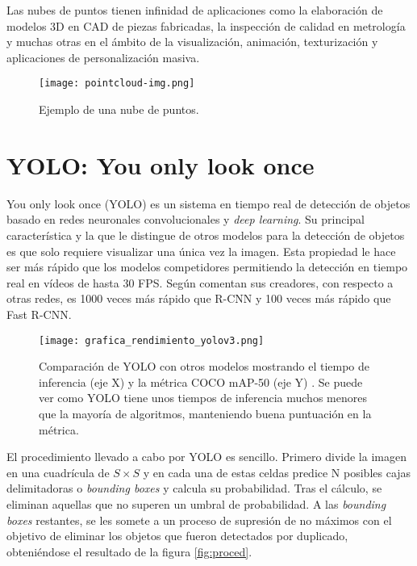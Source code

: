 Las nubes de puntos tienen infinidad de aplicaciones como la elaboración de modelos 3D en CAD de piezas fabricadas, la inspección de calidad en metrología y muchas otras en el ámbito de la visualización, animación, texturización y aplicaciones de personalización masiva.\\

\begin{figure}[h]
	\begin{center} 
		\texttt{[image: pointcloud-img.png]}
	\end{center}
	\caption{Ejemplo de una nube de puntos. \cite{pointcloud_paper}}
	\label{fig:pc}
\end{figure}

\section{YOLO: You only look once}

You only look once (YOLO) es un sistema en tiempo real de detección de objetos basado en redes neuronales convolucionales y \textit{deep learning}. Su principal característica y la que le distingue de otros modelos para la detección de objetos es que solo requiere visualizar una única vez la imagen. Esta propiedad le hace ser más rápido que los modelos competidores permitiendo la detección en tiempo real en vídeos de hasta 30 FPS. Según comentan sus creadores, con respecto a otras redes, es 1000 veces más rápido que R-CNN y 100 veces más rápido que Fast R-CNN.  \cite{yolo} \\

\begin{figure}[h]
	\begin{center} 
		\texttt{[image: grafica\_rendimiento\_yolov3.png]}
	\end{center}
	\caption{Comparación de YOLO con otros modelos mostrando el tiempo de inferencia (eje X) y la métrica COCO mAP-50 (eje Y) \cite{yolo}. Se puede ver como YOLO tiene unos tiempos de inferencia muchos menores que la mayoría de algoritmos, manteniendo buena puntuación en la métrica.}
	\label{fig:rend}
\end{figure}

El procedimiento llevado a cabo por YOLO es sencillo. Primero divide la imagen en una cuadrícula de $S \times S$ y en cada una de estas celdas predice N posibles cajas delimitadoras o \textit{bounding boxes} y calcula su probabilidad. Tras el cálculo, se eliminan aquellas que no superen un umbral de probabilidad. A las \textit{bounding boxes} restantes, se les somete a un proceso de supresión de no máximos con el objetivo de eliminar los objetos que fueron detectados por duplicado, obteniéndose el resultado de la figura \ref{fig:proced}.\\

